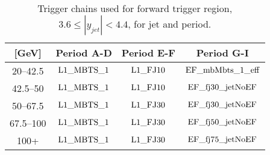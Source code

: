 \begin{table}[htdp]
\centering
\begin{tabular}{ | c | c | c | c | }
  \hline
 \pt{} [GeV] & Period A-D & Period E-F & Period G-I \\
  \hline
\rm 20--42.5 &       $\rm L1\_ MBTS\_ 1$ & $\rm L1\_ FJ10$ & $\rm EF\_ mbMbts\_ 1\_ eff$  \\
\rm 42.5--50 &       $\rm L1\_ MBTS\_ 1$ & $\rm L1\_ FJ10$ & $\rm EF\_ fj30\_ jetNoEF$  \\
\rm 50--67.5 &       $\rm L1\_ MBTS\_ 1$ & $\rm L1\_ FJ30$ & $\rm EF\_ fj30\_ jetNoEF$  \\
\rm 67.5--100 &      $\rm L1\_ MBTS\_ 1$ & $\rm L1\_ FJ30$ & $\rm EF\_ fj50\_ jetNoEF$  \\
\rm 100+ &           $\rm L1\_ MBTS\_ 1$ & $\rm L1\_ FJ30$ & $\rm EF\_ fj75\_ jetNoEF$  \\

  \hline
\end{tabular}
\caption{
Trigger chains used for forward trigger region, $3.6\le|y_{jet}|<4.4$, for jet \pt{} and period.
\label{tab:ForwardTrigger}}
\end{table}%

